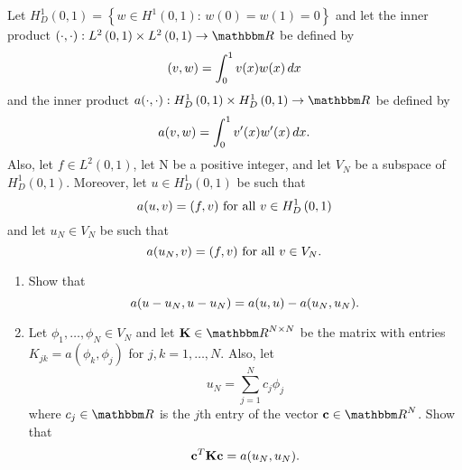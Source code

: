 Let $H^1_D\left(0,1\right)=\left\{w\in H^1\left(0,1\right):\,w(0)=w(1)=0\right\}$ and let the inner product $\ip{\cdot,\cdot}:L^2\left(0,1\right)\times L^2\left(0,1\right)\to\R$ be defined by
\[
(v,w)=\int_0^1v(x)w(x)\,dx
\]
and the inner product $a\ip{\cdot,\cdot}:H^1_D\left(0,1\right)\times H^1_D\left(0,1\right)\to\R$ be defined by
\[
a(v,w)=\int_0^1v'(x)w'(x)\,dx.
\]
Also, let $f\in L^2\left(0,1\right)$, let N be a positive integer, and let $V_N$ be a subspace of $H^1_D\left(0,1\right)$. Moreover, let $u\in H^1_D\left(0,1\right)$ be such that
\[
a(u,v)=(f,v)\mbox{ for all }v\in H^1_D\left(0,1\right)
\]
and let $u_N\in V_N$ be such that
\[
a(u_N,v)=(f,v)\mbox{ for all }v\in V_N.
\]

\begin{enumerate}
\item Show that
\[
a(u-u_N,u-u_N)=a(u,u)-a(u_N,u_N).
\]

\vspace*{1em}
\item Let $\phi_1,\ldots,\phi_N\in V_N$ and let $\BK\in\R^{N\times N}$ be the matrix with entries $K_{jk}=a(\phi_k,\phi_j)$ for $j,k=1,\ldots,N$. Also, let
\[
u_N=\sum_{j=1}^Nc_j\phi_j
\]
where $c_j\in\R$ is the $j$th entry of the vector $\Bc\in\R^N$. Show that
\[
{\bf c}^T{\bf K}{\bf c}=a(u_N,u_N).
\]
\end{enumerate}

           

